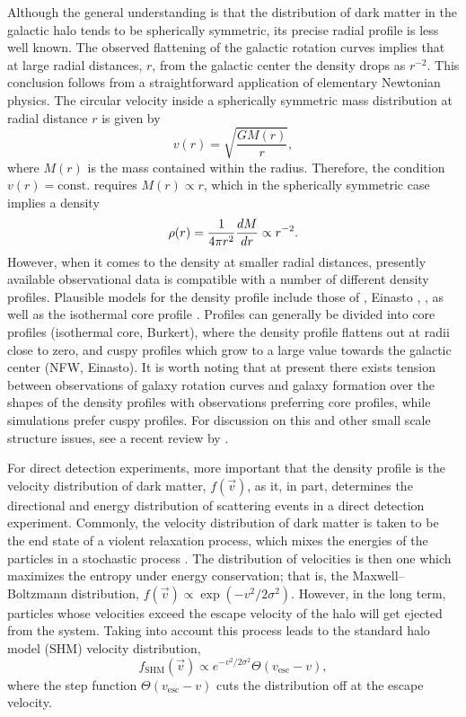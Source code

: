 Although the general understanding is that the distribution of dark matter in the galactic halo tends to be spherically symmetric, its precise radial profile is less well known. The observed flattening of the galactic rotation curves implies that at large radial distances, $r$, from the galactic center the density drops as $r^{-2}$. This conclusion follows from a straightforward application of elementary Newtonian physics. The circular velocity inside a spherically symmetric mass distribution at radial distance $r$ is given by
\begin{equation}
    v(r)=\sqrt{\frac{GM(r)}{r}},
\end{equation}
where $M(r)$ is the mass contained within the radius. Therefore, the condition $v(r)=\text{const.}$ requires $M(r)\propto r$, which in the spherically symmetric case implies a density
\begin{equation}
    \rho(r)=\frac{1}{4\pi r^2}\frac{dM}{dr}\propto r^{-2}.
\end{equation}
However, when it comes to the density at smaller radial distances, presently available observational data is compatible with a number of different density profiles. Plausible models for the density profile include those of \textcite{NavarroFrenkWhite1996}, Einasto \parencites{Einasto1965, MerrittEtAl2006}, \textcite{Burkert1995}, as well as the isothermal core profile \parencites{BahcallSoneira1980, BegemanBroeilsSanders1991}. Profiles can generally be divided into core profiles (isothermal core, Burkert), where the density profile flattens out at radii close to zero, and cuspy profiles which grow to a large value towards the galactic center (NFW, Einasto). It is worth noting that at present there exists tension between observations of galaxy rotation curves and galaxy formation over the shapes of the density profiles with observations preferring core profiles, while simulations prefer cuspy profiles. For discussion on this and other small scale structure issues, see a recent review by \textcite{TulinYu2018}.

For direct detection experiments, more important that the density profile is the velocity distribution of dark matter, $f(\vec{v})$, as it, in part, determines the directional and energy distribution of scattering events in a direct detection experiment. Commonly, the velocity distribution of dark matter is taken to be the end state of a violent relaxation process, which mixes the energies of the particles in a stochastic process \parencite{LyndenBell1967}. The distribution of velocities is then one which maximizes the entropy under energy conservation; that is, the Maxwell--Boltzmann distribution, $f(\vec{v})\propto \exp(-v^2/2\sigma^2)$. However, in the long term, particles whose velocities exceed the escape velocity of the halo will get ejected from the system. Taking into account this process leads to the standard halo model (SHM) velocity distribution,
\begin{equation}
    f_\text{SHM}(\vec{v})\propto e^{-v^2/2\sigma^2}\Theta(v_\text{esc}-v),
    \label{eq:shm-dist}
\end{equation}
where the step function $\Theta(v_\text{esc}-v)$ cuts the distribution off at the escape velocity.

